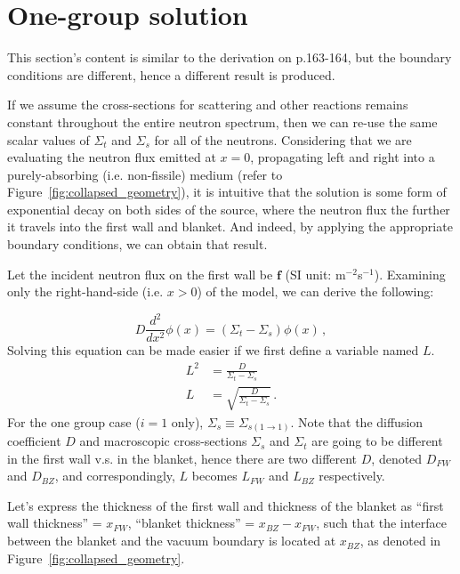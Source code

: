 \documentclass[a4paper, 12pt]{article}
\newcommand{\ve}[1]{\boldsymbol{#1}}
\newcommand{\flux}[0]{\ve{f}}
\begin{document}
\section{One-group solution}
This section's content is similar to the derivation on p.163-164, but the boundary conditions are different, hence a different result is produced.

If we assume the cross-sections for scattering and other reactions remains constant throughout the entire neutron spectrum, then we can re-use the same scalar values of $\Sigma_t$ and $\Sigma_s$ for all of the neutrons. Considering that we are evaluating the neutron flux emitted at $x=0$, propagating left and right into a purely-absorbing (i.e. non-fissile) medium (refer to Figure~\ref{fig:collapsed_geometry}), it is intuitive that the solution is some form of exponential decay on both sides of the source, where the neutron flux the further it travels into the first wall and blanket. And indeed, by applying the appropriate boundary conditions, we can obtain that result.

Let the incident neutron flux on the first wall be $\flux $ (SI unit: m$^{-2}$s$^{-1}$). Examining only the right-hand-side (i.e. $x>0$) of the model, we can derive the following:

\begin{equation}\label{eq:OneGroupDiffusionEqDifferentialForm}
    D \frac{d^2}{dx^2}\phi(x) = (\Sigma_t - \Sigma_s) \phi(x)\,,
\end{equation}
Solving this equation can be made easier if we first define a variable named $L$.
\begin{align}
    L^2 &=      \frac{D}{\Sigma_t-\Sigma_s}\nonumber\\
    L   &=\sqrt{\frac{D}{\Sigma_t-\Sigma_s}}\,.
\end{align}
For the one group case ($i = 1$ only), $\Sigma_s\equiv \Sigma_{s(1\rightarrow1)}$.
Note that the diffusion coefficient $D$ and macroscopic cross-sections $\Sigma_s$ and $\Sigma_t$ are going to be different in the first wall v.s. in the blanket, hence there are two different $D$, denoted $D_{FW}$ and $D_{BZ}$, and correspondingly, $L$ becomes $L_{FW}$ and $L_{BZ}$ respectively.

Let's express the thickness of the first wall and thickness of the blanket as ``first wall thickness'' = $x_{FW}$, ``blanket thickness'' = $x_{BZ} - x_{FW}$, such that the interface between the blanket and the vacuum boundary is located at $x_{BZ}$, as denoted in Figure~\ref{fig:collapsed_geometry}.
\end{document}
